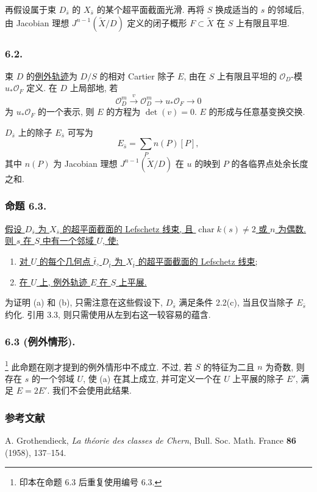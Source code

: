 再假设属于束 $D_{\bar s}$ 的 $X_{\bar s}$ 的某个超平面截面光滑. 再将 $S$ 换成适当的 $s$ 的邻域后, 由 Jacobian 理想 $J^{n-1}(\widetilde X/D)$ 定义的闭子概形 $F\subset\widetilde X$ 在 $S$ 上有限且平坦.

\subsubsection*{6.2.}
束 $D$ 的\underline{例外轨迹}为 $D/S$ 的相对 Cartier 除子 $E$, 由在 $S$ 上有限且平坦的 $\mathcal O_D$-模 $u_*\mathcal O_F$ 定义. 在 $D$ 上局部地, 若
\[
\mathcal O_D^m\xrightarrow{\ v\ }\mathcal O_D^m
\longrightarrow u_*\mathcal O_F\longrightarrow0
\]
为 $u_*\mathcal O_F$ 的一个表示, 则 $E$ 的方程为 $\det(v)=0$. $E$ 的形成与任意基变换交换.

$D_{\bar s}$ 上的除子 $E_{\bar s}$ 可写为
\[
E_{\bar s}=\sum_P n(P)[P],
\]
其中 $n(P)$ 为 Jacobian 理想 $J^{n-1}(\widetilde X/D)$ 在 $u$ 的映到 $P$ 的各临界点处余长度之和.

\subsubsection*{命题 6.3.}
\underline{假设 $D_{\bar s}$ 为 $X_{\bar s}$ 的超平面截面的 Lefschetz 线束, 且 $\operatorname{char}k(s)\ne2$ 或 $n$ 为偶数. 则 $s$ 在 $S$ 中有一个邻域 $U$, 使:}
\begin{enumerate}
\item[(a)] \underline{对 $U$ 的每个几何点 $\bar t$, $D_{\bar t}$ 为 $X_{\bar t}$ 的超平面截面的 Lefschetz 线束;}
\item[(b)] \underline{在 $U$ 上, 例外轨迹 $E$ 在 $S$ 上平展.}
\end{enumerate}
为证明 (a) 和 (b), 只需注意在这些假设下, $D_{\bar s}$ 满足条件 2.2(c), 当且仅当除子 $E_{\bar s}$ 约化. 引用 3.3, 则只需使用从左到右这一较容易的蕴含.

\subsubsection*{6.3 (例外情形).}
\footnote{印本在命题 6.3 后重复使用编号 6.3.}
此命题在刚才提到的例外情形中不成立. 不过, 若 $S$ 的特征为二且 $n$ 为奇数, 则存在 $s$ 的一个邻域 $U$, 使 (a) 在其上成立, 并可定义一个在 $U$ 上平展的除子 $E'$, 满足 $E=2E'$. 我们不会使用此结果.

\subsubsection*{参考文献}

\noindent[1] A. Grothendieck, \emph{La théorie des classes de Chern},
Bull. Soc. Math. France \textbf{86} (1958), 137--154.

